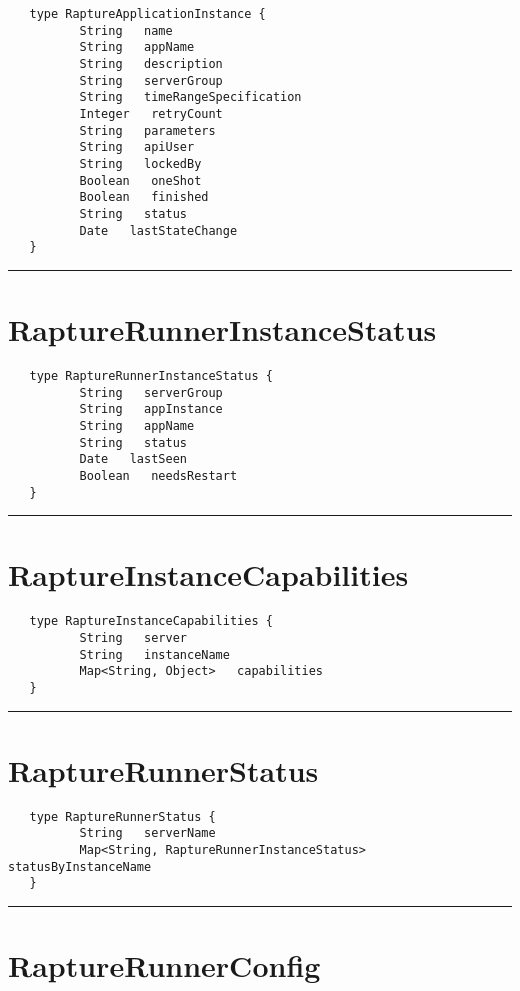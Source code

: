 \begin{verbatim}
   type RaptureApplicationInstance {
          String   name
          String   appName
          String   description
          String   serverGroup
          String   timeRangeSpecification
          Integer   retryCount
          String   parameters
          String   apiUser
          String   lockedBy
          Boolean   oneShot
          Boolean   finished
          String   status
          Date   lastStateChange
   }
\end{verbatim}

\rule{15cm}{2pt}
\section{RaptureRunnerInstanceStatus}
\label{type:RaptureRunnerInstanceStatus}

\begin{verbatim}
   type RaptureRunnerInstanceStatus {
          String   serverGroup
          String   appInstance
          String   appName
          String   status
          Date   lastSeen
          Boolean   needsRestart
   }
\end{verbatim}

\rule{15cm}{2pt}
\section{RaptureInstanceCapabilities}
\label{type:RaptureInstanceCapabilities}

\begin{verbatim}
   type RaptureInstanceCapabilities {
          String   server
          String   instanceName
          Map<String, Object>   capabilities
   }
\end{verbatim}

\rule{15cm}{2pt}
\section{RaptureRunnerStatus}
\label{type:RaptureRunnerStatus}

\begin{verbatim}
   type RaptureRunnerStatus {
          String   serverName
          Map<String, RaptureRunnerInstanceStatus>   statusByInstanceName
   }
\end{verbatim}

\rule{15cm}{2pt}
\section{RaptureRunnerConfig}
\label{type:RaptureRunnerConfig}

